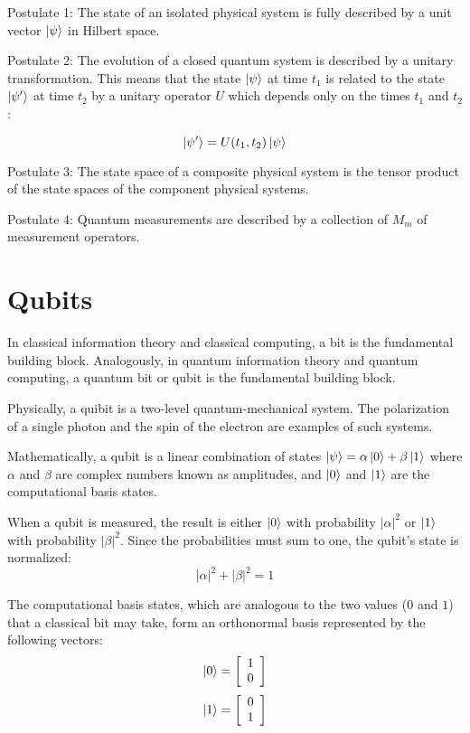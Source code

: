 Postulate 1: The state of an isolated physical system is fully described by a unit vector $\left|{\psi}\right\rangle$ in Hilbert space.

Postulate 2: The evolution of a closed quantum system is described by a unitary transformation. This means that the state $\left|{\psi}\right\rangle$ at time $t_1$ is related to the state $\left|{\psi'}\right\rangle$ at time $t_2$ by a unitary operator $U$ which depends only on the times $t_1$ and $t_2$:

$$\left|{\psi'}\right\rangle=U(t_1,t_2)\left|{\psi}\right\rangle$$

Postulate 3: The state space of a composite physical system is the tensor product of the state spaces of the component physical systems.

Postulate 4: Quantum measurements are described by a collection of ${M_m}$ of measurement operators.

\section{Qubits}

In classical information theory and classical computing, a bit is the fundamental building block.
Analogously, in quantum information theory and quantum computing, a quantum bit or qubit is the fundamental building block.

Physically, a quibit is a two-level quantum-mechanical system. The polarization of a single photon and the spin of the electron are examples of such systems.

Mathematically, a qubit is a linear combination of states $\left|{\psi}\right\rangle=\alpha\left|{0}\right\rangle+\beta\left|{1}\right\rangle$ where $\alpha$ and $\beta$ are complex numbers known as amplitudes, and $\left|{0}\right\rangle$ and $\left|{1}\right\rangle$ are the computational basis states.

When a qubit is measured, the result is either $\left|{0}\right\rangle$ with probability $|\alpha|^2$ or $\left|{1}\right\rangle$ with probability $|\beta|^2$.
Since the probabilities must sum to one, the qubit's state is normalized:
$$|\alpha|^2+|\beta|^2=1$$

The computational basis states, which are analogous to the two values ($0$ and $1$) that a classical bit may take, form an orthonormal basis represented by the following vectors:
$$\left|{0}\right\rangle=\left[\begin{array}{c}1 \\ 0\end{array}\right]$$
$$\left|{1}\right\rangle=\left[\begin{array}{c}0 \\ 1\end{array}\right]$$

